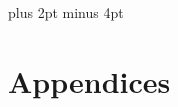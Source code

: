 \documentclass[a4paper,titlepage,draft]{article}
\begin{document}
\parindent=0pt %
\parskip=8pt plus 2pt minus 4pt

\setcounter{page}{1}

\tableofcontents
\newpage

\begin{spacing}{1.15}


\pagebreak

\pagebreak

\pagebreak

\pagebreak

\pagebreak

\pagebreak


\end{spacing}
\pagebreak


\newpage
\appendix
\section*{Appendices}


%
\end{document}
